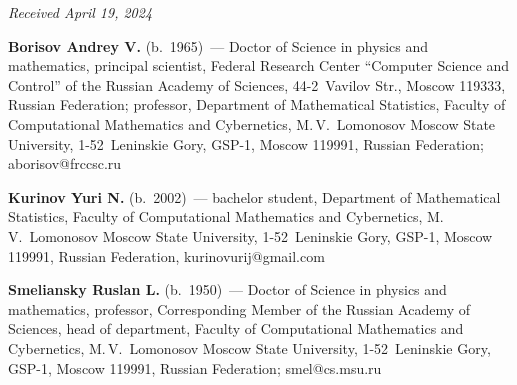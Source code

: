 \vspace*{-6pt}

\hfill{\small\textit{Received April 19, 2024}} 

\vspace*{-18pt}

\Contr

\vspace*{-3pt}

\noindent
\textbf{Borisov Andrey V.} (b.\ 1965)~--- Doctor of Science in physics and 
mathematics, principal scientist, 
Federal Research Center ``Computer Science and Control'' of the Russian Academy of 
Sciences,  44-2~Vavilov Str., Moscow 119333, Russian Federation; professor, Department of 
Mathematical Statistics, 
Faculty of Computational Mathematics and Cybernetics, M.\,V.~Lomonosov Moscow 
State University, 1-52~Leninskie Gory,  GSP-1, Moscow 119991, Russian Federation; \mbox{aborisov@frccsc.ru}

\vspace*{3pt}

\noindent
\textbf{Kurinov Yuri N.} (b.\ 2002)~--- bachelor student, Department of 
Mathematical Statistics, Faculty of Computational Mathematics and Cybernetics, 
M.\,V.~Lomonosov Moscow State University, 1-52~Leninskie Gory,
GSP-1, Moscow 119991, Russian Federation, \mbox{kurinovurij@gmail.com}

\vspace*{3pt}

\noindent
\textbf{Smeliansky Ruslan L.} (b.\ 1950)~--- Doctor of Science in physics and 
mathematics, professor, Corresponding Member of the Russian Academy of Sciences, head of
department, Faculty of Computational Mathematics and Cybernetics, 
M.\,V.~Lomonosov Moscow State University, 1-52~Leninskie Gory,
GSP-1, Moscow 119991, Russian Federation; \mbox{smel@cs.msu.ru}


\label{end\stat}

\renewcommand{\bibname}{\protect\rm Литература} 